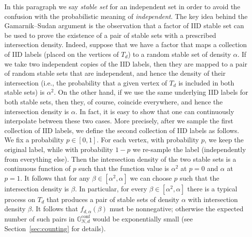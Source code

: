 \documentclass[12pt]{amsart}
\theoremstyle{definition}
\newcommand\Gbconf{\mathbb{G}^{\textrm{conf}}}
\newcommand\al{\alpha}
\newcommand\be{\beta}
\begin{document}
In this paragraph we say \emph{stable set} for an independent set in order to avoid the confusion with the probabilistic meaning of \emph{independent}. The key idea behind the Gamarnik--Sudan argument is the observation that a factor of IID stable set can be used to prove the existence of a pair of stable sets with a prescribed intersection density. Indeed, suppose that we have a factor that maps a collection of IID labels (placed on the vertices of $T_d$) to a random stable set of density $\al$. If we take two independent copies of the IID labels, then they are mapped to a pair of random stable sets that are independent, and hence the density of their intersection (i.e., the probability that a given vertex of $T_d$ is included in both stable sets) is $\al^2$. On the other hand, if we use the same underlying IID labels for both stable sets, then they, of course, coincide everywhere, and hence the intersection density is $\al$. In fact, it is easy to show that one can continuously interpolate between these two cases. More precisely, after we sample the first collection of IID labels, we define the second collection of IID labels as follows. We fix a probability $p \in [0,1]$. For each vertex, with probability $p$, we keep the original label, while with probability $1-p$ we re-sample the label (independently from everything else). Then the intersection density of the two stable sets is a continuous function of $p$ such that the function value is $\al^2$ at $p=0$ and $\al$ at $p=1$. It follows that for any $\be \in [\al^2,\al]$ we can choose $p$ such that the intersection density is $\be$. In particular, for every $\be \in [\al^2,\al]$ there is a typical process on $T_d$ that produces a pair of stable sets of density $\al$ with intersection density $\be$. It follows that $f_{d,\al}(\be)$ must be nonnegative; otherwise the expected number of such pairs in $\Gbconf_{N,d}$ would be exponentially small (see Section~\ref{sec:counting} for details).
\end{document}
